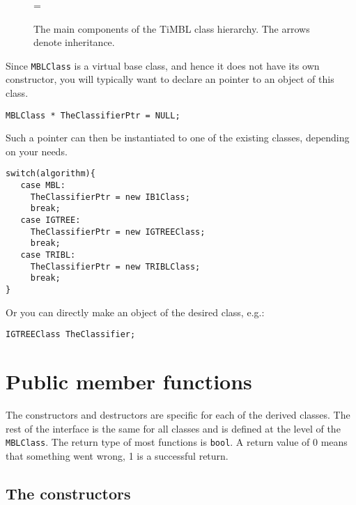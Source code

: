 \documentclass{report}
\begin{document}
\begin{figure}[htb]
        \begin{center}
                \leavevmode
                \epsfxsize=\columnwidth
                \caption{The main components of the TiMBL class hierarchy. 
		The arrows denote inheritance.
                }
                \label{classes}
        \end{center}
\end{figure}

Since {\tt MBLClass} is a virtual base class, and hence it does not
have its own constructor, you will typically want to declare an
pointer to an object of this class.

\begin{verbatim}
MBLClass * TheClassifierPtr = NULL;	
\end{verbatim}

\noindent
Such a pointer can then be instantiated to one of the existing
classes, depending on your needs.

\begin{verbatim}
switch(algorithm){
   case MBL:
     TheClassifierPtr = new IB1Class;
     break;
   case IGTREE:
     TheClassifierPtr = new IGTREEClass;
     break;
   case TRIBL:
     TheClassifierPtr = new TRIBLClass;
     break;
}	
\end{verbatim}

\noindent
Or you can directly make an object of the desired class, e.g.:

\begin{verbatim}
IGTREEClass TheClassifier;
\end{verbatim}

\section{Public member functions}
\label{membersection}

The constructors and destructors are specific for each of the derived
classes. The rest of the interface is the same for all classes and is
defined at the level of the {\tt MBLClass}. The return type of most
functions is {\tt bool}. A return value of 0 means that something went
wrong, 1 is a successful return.

\subsection{The constructors}
\end{document}
